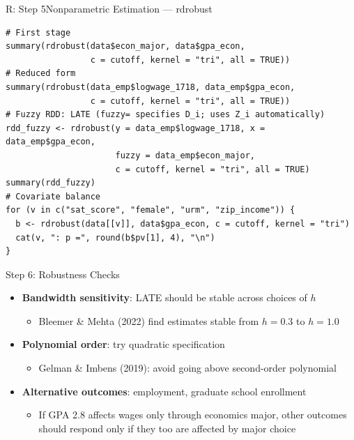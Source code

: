 \documentclass[hyperref={pdfpagelabels=false}]{beamer}
\begin{document}
\begin{frame}[fragile]{R: Step 5}{Nonparametric Estimation --- rdrobust}
\begin{lstlisting}[style=r-style]
# First stage
summary(rdrobust(data$econ_major, data$gpa_econ,
                 c = cutoff, kernel = "tri", all = TRUE))
# Reduced form
summary(rdrobust(data_emp$logwage_1718, data_emp$gpa_econ,
                 c = cutoff, kernel = "tri", all = TRUE))
# Fuzzy RDD: LATE (fuzzy= specifies D_i; uses Z_i automatically)
rdd_fuzzy <- rdrobust(y = data_emp$logwage_1718, x = data_emp$gpa_econ,
                      fuzzy = data_emp$econ_major,
                      c = cutoff, kernel = "tri", all = TRUE)
summary(rdd_fuzzy)
# Covariate balance
for (v in c("sat_score", "female", "urm", "zip_income")) {
  b <- rdrobust(data[[v]], data$gpa_econ, c = cutoff, kernel = "tri")
  cat(v, ": p =", round(b$pv[1], 4), "\n")
}
\end{lstlisting}
\end{frame}


\begin{frame}{Step 6: Robustness Checks}{}
	\begin{itemize}
		\item \textbf{Bandwidth sensitivity}: LATE should be stable across choices of $h$
		\vspace{0.2cm}
		\begin{itemize}
			\item Bleemer \& Mehta (2022) find estimates stable from $h = 0.3$ to $h = 1.0$
		\end{itemize}
		\vspace{0.2cm}
		\item \textbf{Polynomial order}: try quadratic specification
		\vspace{0.2cm}
		\begin{itemize}
			\item Gelman \& Imbens (2019): avoid going above second-order polynomial
		\end{itemize}
		\vspace{0.2cm}
		\item \textbf{Alternative outcomes}: employment, graduate school enrollment
		\vspace{0.2cm}
		\begin{itemize}
			\item If GPA 2.8 affects wages only through economics major, other outcomes
			should respond only if they too are affected by major choice
		\end{itemize}
	\end{itemize}
\end{frame}
\end{document}
